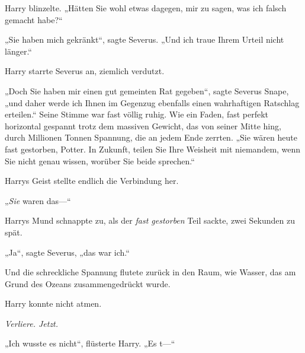 Harry blinzelte. „Hätten Sie wohl etwas dagegen, mir zu sagen, was ich falsch gemacht habe?“

„Sie haben mich gekränkt“, sagte Severus. „Und ich traue Ihrem Urteil nicht länger.“

Harry starrte Severus an, ziemlich verdutzt.

„Doch Sie haben mir einen gut gemeinten Rat gegeben“, sagte Severus Snape, „und daher werde ich Ihnen im Gegenzug ebenfalls einen wahrhaftigen Ratschlag erteilen.“ Seine Stimme war fast völlig ruhig. Wie ein Faden, fast perfekt horizontal gespannt trotz dem massiven Gewicht, das von seiner Mitte hing, durch Millionen Tonnen Spannung, die an jedem Ende zerrten. „Sie wären heute fast gestorben, Potter. In Zukunft, teilen Sie Ihre Weisheit mit niemandem, wenn Sie nicht genau wissen, worüber Sie beide sprechen.“

Harrys Geist stellte endlich die Verbindung her.

„\emph{Sie} waren das—“

Harrys Mund schnappte zu, als der \emph{fast gestorben} Teil sackte, zwei Sekunden zu spät.

„Ja“, sagte Severus, „das war ich.“

Und die schreckliche Spannung flutete zurück in den Raum, wie Wasser, das am Grund des Ozeans zusammengedrückt wurde.

Harry konnte nicht atmen.

\emph{Verliere. Jetzt.}

„Ich wusste es nicht“, flüsterte Harry. „Es t—“

